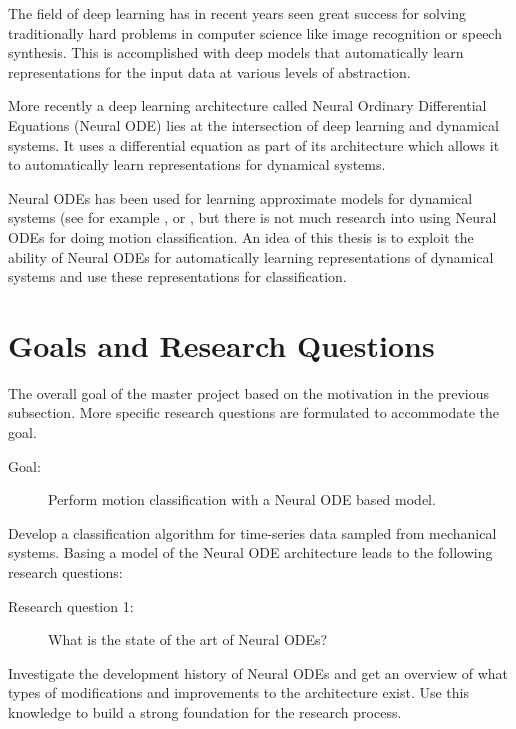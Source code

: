 \documentclass[12pt,a4paper]{book}
\begin{document}
The field of deep learning has in recent years seen great success for solving traditionally hard problems in computer science like image recognition or speech synthesis. This is accomplished with deep models that automatically learn representations for the input data at various levels of abstraction.

More recently a deep learning architecture called Neural Ordinary Differential Equations (Neural ODE) \citep{node} lies at the intersection of deep learning and dynamical systems. It uses a differential equation as part of its architecture which allows it to automatically learn representations for dynamical systems.

Neural ODEs has been used for learning approximate models for dynamical systems (see for example \citep{node}, \citep{hamiltoniannode} or \citep{lagrangiannode}, but there is not much research into using Neural ODEs for doing motion classification. An idea of this thesis is to exploit the ability of Neural ODEs for automatically learning representations of dynamical systems and use these representations for classification.

\section{Goals and Research Questions}
\label{sec:Goals and Research Questions}

The overall goal of the master project based on the motivation in the previous subsection. More specific research questions are formulated to accommodate the goal.

\begin{description}
\item[Goal:] {Perform motion classification with a Neural ODE based model.}
\end{description}

Develop a classification algorithm for time-series data sampled from mechanical systems. Basing a model of the Neural ODE architecture leads to the following research questions:

\begin{description}
\item[Research question 1:] {What is the state of the art of Neural ODEs?}
\end{description}

Investigate the development history of Neural ODEs and get an overview of what types of modifications and improvements to the architecture exist. Use this knowledge to build a strong foundation for the research process.
\end{document}
